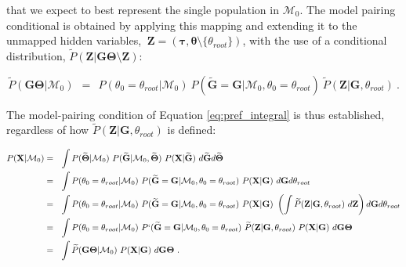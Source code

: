 \documentclass[11pt]{article}
\newcommand{\vect}[1]{\boldsymbol{\mathbf{#1}}}
\newcommand{\X}{\vect{X}}
\newcommand{\M}{\mathcal{M}}
\newcommand{\G}{\vect{G}}
\newcommand{\T}{\vect{\Theta}}
\newcommand{\GT}{\G\T}
\newcommand{\Pref}{\widetilde{P}}
\newcommand{\Gref}{\widetilde{\G}}
\newcommand{\Tref}{\widetilde{\T}}
\newcommand{\1}{\mathbbm{1}}
\newcommand{\Z}{\vect{Z}}
\newcommand{\troot}{\theta_{root}}
\newcommand{\taus}{\vect\tau}
\newcommand{\thetas}{\vect\theta}
\begin{document}
that we expect to best represent the single population in $\M_0$.
%
The model pairing conditional is obtained by applying this mapping and extending it to the unmapped hidden variables, $~ \Z=(\taus,\thetas\setminus \{\troot\})$, with the use of a conditional distribution, $\Pref(\Z|\GT\setminus\Z)$:
%
%
\begin{small}
\begin{equation}
 \Pref(\GT|\M_0)  ~~=~~
 P(\theta_0=\troot|\M_0)\ P(\Gref=\G|\M_0,\theta_0=\troot)\ \Pref(\Z|\G,\troot)   ~ .\label{eq:pref_null}
\end{equation}
\end{small}
%
%
The model-pairing condition of Equation \ref{eq:pref_integral} is thus established, regardless of how $\Pref(\Z|\G,\troot)$ is defined:
%
%
\begin{small}
\begin{align}
P(\X|\M_0)
&=~~ \int P(\Tref|\M_0)\ P(\Gref|\M_0,\Tref)\ P(\X|\Gref)\   d\Gref d\Tref  \notag \\ %
&=~~ \int P(\theta_0=\troot|\M_0)\ P(\Gref=\G|\M_0,\theta_0=\troot)\ P(\X|\G)\  d\G d\troot \notag \\ 
&=~~ \int P(\theta_0=\troot|\M_0)\ P(\Gref=\G|\M_0,\theta_0=\troot)\ P(\X|\G)\
\left( \int \Pref(\Z|\G,\troot)\ d\Z \right) d\G d\troot \notag \\ 
%
&=~~ \int P(\theta_0=\troot|\M_0)\ P`(\Gref=\G|\M_0,\theta_0=\troot)\ \Pref(\Z|\G,\troot)\ P(\X|\G)\ d\GT \notag \\ 
&=~~ \int \Pref(\GT|\M_0)\ P(\X|\G)\ d\GT ~. \label{eq:likelihood_null} %
\end{align}
\end{small}
\end{document}
